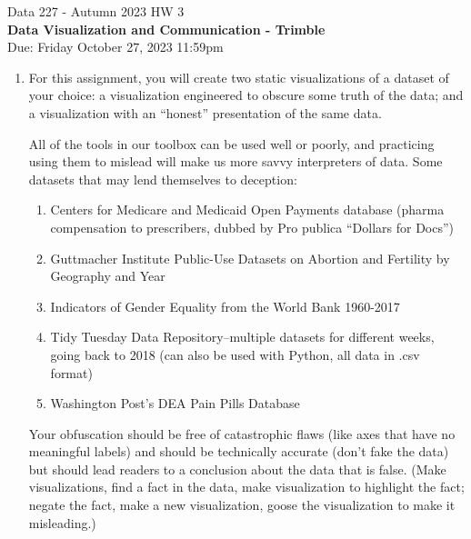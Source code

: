 \documentclass[]{book}
\theoremstyle{definition}
\begin{document}
\begin{center}
{\Large Data 227 - Autumn 2023 \hspace{0.5cm} HW 3}\\
\textbf{Data Visualization and Communication - Trimble}\\ %
Due: Friday October 27, 2023  11:59pm   
\end{center}

\vspace{0.2 cm}

\begin{enumerate}
\subsection*{Misleading visualization design pair}
\item\label{mislead}

For this assignment, you will create two static visualizations of a dataset of your choice:   a visualization engineered to obscure some truth of the data; and a visualization with an “honest” presentation of the same data.

All of the tools in our toolbox can be used well or poorly, and practicing using them to mislead will make us more savvy interpreters of data.
Some datasets that may lend themselves to deception:

\begin{enumerate}
\item Centers for Medicare and Medicaid Open Payments database (pharma compensation to prescribers, dubbed by Pro publica “Dollars for Docs”)
\item Guttmacher Institute Public-Use Datasets on Abortion and Fertility by Geography and Year
\item Indicators of Gender Equality from the World Bank 1960-2017
\item Tidy Tuesday Data Repository–multiple datasets for different weeks, going back to 2018 (can also be used with Python, all data in .csv format)
\item Washington Post’s DEA Pain Pills Database
\end{enumerate}

Your obfuscation should be free of catastrophic flaws (like axes that have no meaningful labels) and should be technically accurate (don't fake the data) but should lead readers to a conclusion about the data that is false.  (Make visualizations, find a fact in the data, make visualization to highlight the fact; negate the fact, make a new visualization, goose the visualization to make it misleading.)  


\end{enumerate}
\end{document}
